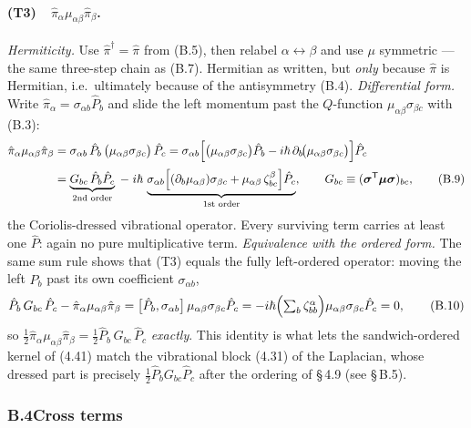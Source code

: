 \paragraph{(T3)\ \ $\hat\pi_\alpha\mu_{\alpha\beta}\hat\pi_\beta$.}
\emph{Hermiticity.} Use $\hat\pi^{\dagger}=\hat\pi$ from (B.5), then relabel $\alpha\leftrightarrow\beta$ and use $\mu$ symmetric --- the same three-step chain as (B.7). Hermitian as written, but \emph{only} because $\hat\pi$ is Hermitian, i.e.\ ultimately because of the antisymmetry (B.4). \emph{Differential form.} Write $\hat\pi_\alpha=\sigma_{\alpha b}\hat P_b$ and slide the left momentum past the $Q$-function $\mu_{\alpha\beta}\sigma_{\beta c}$ with (B.3):
\begin{align}
\hat\pi_\alpha\mu_{\alpha\beta}\hat\pi_\beta
&=\sigma_{\alpha b}\,\hat P_b\,\bigl(\mu_{\alpha\beta}\sigma_{\beta c}\bigr)\,\hat P_c
=\sigma_{\alpha b}\Bigl[\bigl(\mu_{\alpha\beta}\sigma_{\beta c}\bigr)\hat P_b-i\hbar\,\partial_b\!\bigl(\mu_{\alpha\beta}\sigma_{\beta c}\bigr)\Bigr]\hat P_c\nonumber\\[2pt]
&=\underbrace{G_{bc}\,\hat P_b\hat P_c}_{\text{2nd order}}
\;-\;i\hbar\,\underbrace{\sigma_{\alpha b}\Bigl[(\partial_b\mu_{\alpha\beta})\sigma_{\beta c}+\mu_{\alpha\beta}\,\zeta^{\beta}_{bc}\Bigr]\hat P_c}_{\text{1st order}},
\qquad G_{bc}\equiv(\boldsymbol\sigma^{\mathsf T}\boldsymbol\mu\boldsymbol\sigma)_{bc}, \tag{B.9}
\end{align}
the Coriolis-dressed vibrational operator. Every surviving term carries at least one $\hat P$: again no pure multiplicative term. \emph{Equivalence with the ordered form.} The same sum rule shows that (T3) equals the fully left-ordered operator: moving the left $\hat P_b$ past its own coefficient $\sigma_{\alpha b}$,
\begin{equation}
\hat P_b\,G_{bc}\,\hat P_c
-\hat\pi_\alpha\mu_{\alpha\beta}\hat\pi_\beta
=\bigl[\hat P_b,\sigma_{\alpha b}\bigr]\,\mu_{\alpha\beta}\sigma_{\beta c}\hat P_c
=-i\hbar\Bigl(\textstyle\sum_b\zeta^{\alpha}_{bb}\Bigr)\mu_{\alpha\beta}\sigma_{\beta c}\hat P_c=0 , \tag{B.10}
\end{equation}
so $\tfrac12\hat\pi_\alpha\mu_{\alpha\beta}\hat\pi_\beta=\tfrac12\hat P_b\,G_{bc}\,\hat P_c$ \emph{exactly}. This identity is what lets the sandwich-ordered kernel of (4.41) match the vibrational block (4.31) of the Laplacian, whose dressed part is precisely $\tfrac12\hat P_bG_{bc}\hat P_c$ after the ordering of \S\,4.9 (see \S\,B.5).

\subsubsection*{B.4\quad Cross terms}

